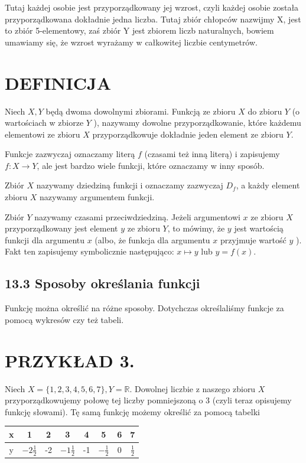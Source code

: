 \documentclass[10pt]{article}
\begin{document}
Tutaj każdej osobie jest przyporządkowany jej wzrost, czyli każdej osobie została przyporządkowana dokładnie jedna liczba. Tutaj zbiór chłopców nazwijmy X, jest to zbiór 5-elementowy, zaś zbiór Y jest zbiorem liczb naturalnych, bowiem umawiamy się, że wzrost wyrażamy w całkowitej liczbie centymetrów.

\section*{DEFINICJA}
Niech \(X, Y\) będą dwoma dowolnymi zbiorami. Funkcją ze zbioru \(X\) do zbioru \(Y\) (o wartościach w zbiorze \(Y\) ), nazywamy dowolne przyporządkowanie, które każdemu elementowi ze zbioru \(X\) przyporządkowuje dokładnie jeden element ze zbioru \(Y\).

Funkcje zazwyczaj oznaczamy literą \(f\) (czasami też inną literą) i zapisujemy \(f: X \longrightarrow Y\), ale jest bardzo wiele funkcji, które oznaczamy w inny sposób.

Zbiór \(X\) nazywamy dziedziną funkcji i oznaczamy zazwyczaj \(D_{f}\), a każdy element zbioru \(X\) nazywamy argumentem funkcji.

Zbiór \(Y\) nazywamy czasami przeciwdziedziną. Jeżeli argumentowi \(x\) ze zbioru \(X\) przyporządkowany jest element \(y\) ze zbioru \(Y\), to mówimy, że \(y\) jest wartością funkcji dla argumentu \(x\) (albo, że funkcja dla argumentu \(x\) przyjmuje wartość \(y\) ). Fakt ten zapisujemy symbolicznie następująco: \(x \longmapsto y\) lub \(y=f(x)\).

\subsection*{13.3 Sposoby określania funkcji}
Funkcję można określić na różne sposoby. Dotychczas określaliśmy funkcje za pomocą wykresów czy też tabeli.

\section*{PRZYKŁAD 3.}
Niech \(X=\{1,2,3,4,5,6,7\}, Y=\mathbb{R}\). Dowolnej liczbie z naszego zbioru \(X\) przyporządkowujemy połowę tej liczby pomniejszoną o 3 (czyli teraz opisujemy funkcję słowami). Tę samą funkcję możemy określić za pomocą tabelki

\begin{center}
\begin{tabular}{|c|c|c|c|c|c|c|c|}
\hline
x & 1 & 2 & 3 & 4 & 5 & 6 & 7 \\
\hline
y & \(-2 \frac{1}{2}\) & -2 & \(-1 \frac{1}{2}\) & -1 & \(-\frac{1}{2}\) & 0 & \(\frac{1}{2}\) \\
\hline
\end{tabular}
\end{center}
\end{document}
